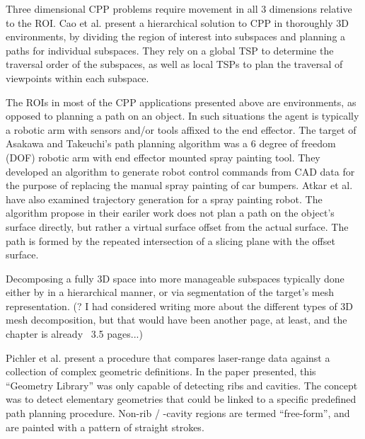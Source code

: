 Three dimensional CPP problems require movement in all 3 dimensions relative to the ROI\cite{CPP_survey_for_robotics}.
Cao et al. present a hierarchical solution to CPP in thoroughly 3D environments, by dividing the region of interest into subspaces and planning a paths for individual subspaces\cite{HiCPP_cplx_3D_env}.
They rely on a global TSP to determine the traversal order of the subspaces, as well as local TSPs to plan the traversal of viewpoints within each subspace.

The ROIs in most of the CPP applications presented above are environments, as opposed to planning a path on an object.
In such situations the agent is typically a robotic arm with sensors and/or tools affixed to the end effector\cite{Metal_polishing_robot_sys, Automatic_spray_painting_unknown_parts}.
The target of Asakawa and Takeuchi's path planning algorithm was a 6 degree of freedom (DOF) robotic arm with end effector mounted spray painting tool\cite{Automatic_spray_painting_path}.
They developed an algorithm to generate robot control commands from CAD data for the purpose of replacing the manual spray painting of car bumpers.
Atkar et al. have also examined trajectory generation for a spray painting robot.
The algorithm propose in their eariler work does not plan a path on the object's surface directly, but rather a virtual surface offset from the actual surface.
The path is formed by the repeated intersection of a slicing plane with the offset surface.

Decomposing a fully 3D space into more manageable subspaces typically done either by in a hierarchical manner\cite{HiCPP_cplx_3D_env}, or via segmentation of the target's mesh representation\cite{Mesh_segm_technik_survey}.
(? I had considered writing more about the different types of 3D mesh decomposition, but that would have been another page, at least, and the chapter is already ~3.5 pages...)

Pichler et al. present a procedure that compares laser-range data against a collection of complex geometric definitions\cite{Automatic_spray_painting_unknown_parts}.
In the paper presented, this ``Geometry Library'' was only capable of detecting ribs and cavities.
The concept was to detect elementary geometries that could be linked to a specific predefined path planning procedure.
Non-rib / -cavity regions are termed ``free-form'', and are painted with a pattern of straight strokes.

